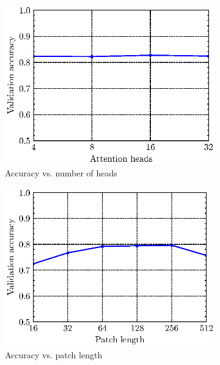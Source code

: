 \begin{figure}
\begin{subfigure}[b]{0.45\textwidth}
        \includegraphics[width=\textwidth]{assets/acc_vs_hyperparam/att_head.eps}
        \caption{Accuracy vs. number of heads}
        \label{fig:att_heads}
    \end{subfigure}
    \hfill
    \begin{subfigure}[b]{0.45\textwidth}
        \includegraphics[width=\textwidth]{assets/acc_vs_hyperparam/patch_len.eps}
        \caption{Accuracy vs. patch length}
        \label{fig:patch_len_acc}
    \end{subfigure}
    \vfill
    \begin{subfigure}[b]{0.45\textwidth}

\end{subfigure}
\end{figure}
